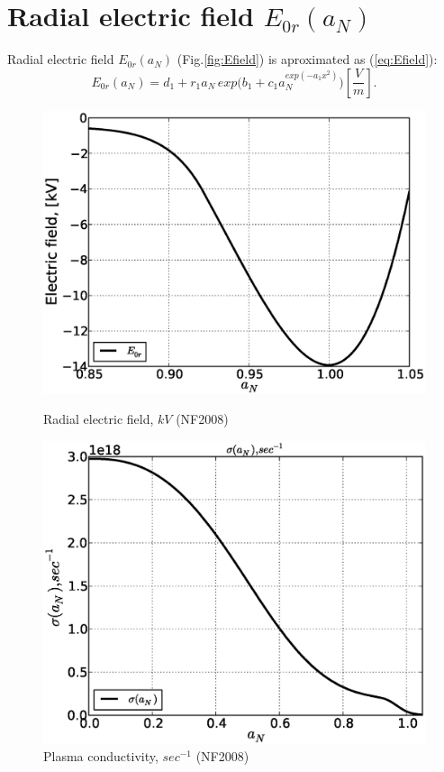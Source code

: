\documentclass[11pt,oneside,a4paper,notitlepage]{article}
\begin{document}
\section{Radial electric field $E_{0r}(a_N)$}
Radial electric field $E_{0r}(a_N)$ (Fig.\ref{fig:Efield}) is aproximated as (\ref{eq:Efield}):
\begin{equation}\label{eq:Efield}
 E_{0r}(a_N)=d_1+r_1a_N\,exp\Bigg(b_1+c_1a_N^{exp(-a_1x^2)}\Bigg)[\frac{V}{m}]. 
\end{equation}
\begin{figure}[h]
\begin{center}
\begin{minipage}[ht]{0.4\linewidth} 
 \centering
 \includegraphics[width=1.35\linewidth]{E.eps}
 \caption{Radial electric field, $kV$ (NF2008)}
 \label{fig:Efield}
\end{minipage}
\hfill
\begin{minipage}[h]{0.4\linewidth}
 \centering
 \includegraphics[width=1.35\linewidth]{sigma.eps}
 \caption{Plasma conductivity, $sec^{-1}$ (NF2008)}
 \label{fig:sigma}
\end{minipage}
\end{center}
\end{figure}
\end{document}
